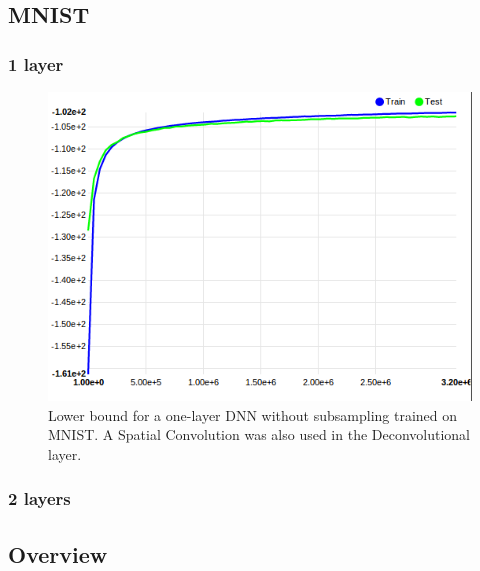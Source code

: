 \subsection{MNIST}

\subsubsection{1 layer}


\begin{figure}
	\includegraphics[scale=0.8,trim=0cm 0cm 0.1cm 0cm, clip=true]{images/MNIST_28_conv_nocuda.png}
	\caption{Lower bound for a one-layer DNN without subsampling trained on MNIST. A Spatial Convolution was also used in the Deconvolutional layer.}
	\label{label1}
\end{figure}

\subsubsection{2 layers}

\subsection{Overview}

